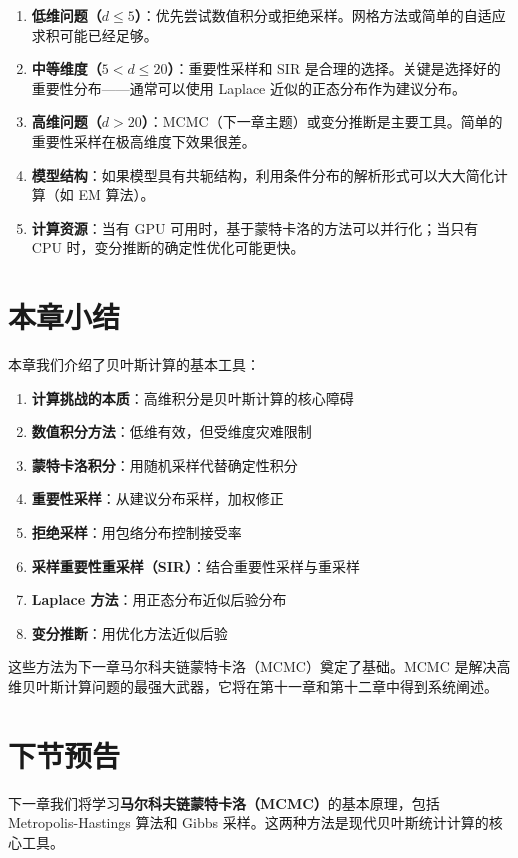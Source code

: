 \begin{enumerate}
  \item \textbf{低维问题（$d \leq 5$）}：优先尝试数值积分或拒绝采样。网格方法或简单的自适应求积可能已经足够。
  \item \textbf{中等维度（$5 < d \leq 20$）}：重要性采样和 SIR 是合理的选择。关键是选择好的重要性分布——通常可以使用 Laplace 近似的正态分布作为建议分布。
  \item \textbf{高维问题（$d > 20$）}：MCMC（下一章主题）或变分推断是主要工具。简单的重要性采样在极高维度下效果很差。
  \item \textbf{模型结构}：如果模型具有共轭结构，利用条件分布的解析形式可以大大简化计算（如 EM 算法）。
  \item \textbf{计算资源}：当有 GPU 可用时，基于蒙特卡洛的方法可以并行化；当只有 CPU 时，变分推断的确定性优化可能更快。
\end{enumerate}

\section{本章小结}

本章我们介绍了贝叶斯计算的基本工具：

\begin{enumerate}
  \item \textbf{计算挑战的本质}：高维积分是贝叶斯计算的核心障碍
  \item \textbf{数值积分方法}：低维有效，但受维度灾难限制
  \item \textbf{蒙特卡洛积分}：用随机采样代替确定性积分
  \item \textbf{重要性采样}：从建议分布采样，加权修正
  \item \textbf{拒绝采样}：用包络分布控制接受率
  \item \textbf{采样重要性重采样（SIR）}：结合重要性采样与重采样
  \item \textbf{Laplace 方法}：用正态分布近似后验分布
  \item \textbf{变分推断}：用优化方法近似后验
\end{enumerate}

这些方法为下一章马尔科夫链蒙特卡洛（MCMC）奠定了基础。MCMC 是解决高维贝叶斯计算问题的最强大武器，它将在第十一章和第十二章中得到系统阐述。

\section{下节预告}

下一章我们将学习\textbf{马尔科夫链蒙特卡洛（MCMC）}的基本原理，包括 Metropolis-Hastings 算法和 Gibbs 采样。这两种方法是现代贝叶斯统计计算的核心工具。

\endinput
